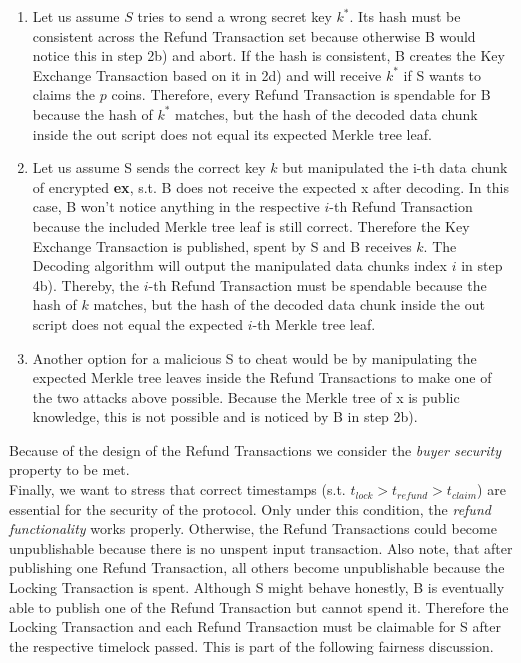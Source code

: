\documentclass{cacthesis}
\newcounter{protocol}
\begin{document}
        \begin{enumerate}
            \item Let us assume $S$ tries to send a wrong secret key $k^*$. Its hash must be consistent across the Refund Transaction set because otherwise B would notice this in step 2b) and abort. If the hash is consistent, B creates the Key Exchange Transaction based on it in 2d) and will receive $k^*$ if S wants to claims the $p$ coins. Therefore, every Refund Transaction is spendable for B because the hash of $k^*$ matches, but the hash of the decoded data chunk inside the out script does not equal its expected Merkle tree leaf.

            \item Let us assume S sends the correct key $k$ but manipulated the i-th data chunk of encrypted \textsf{\textbf{ex}}, s.t. B does not receive the expected \textsf{x} after decoding. In this case, B won't notice anything in the respective $i$-th Refund Transaction because the included Merkle tree leaf is still correct. Therefore the Key Exchange Transaction is published, spent by S and  B receives $k$.  The \textsf{Decoding} algorithm will output the manipulated data chunks index $i$ in step 4b). Thereby, the $i$-th Refund Transaction must be spendable because the hash of $k$ matches, but the hash of the decoded data chunk inside the out script does not equal the expected $i$-th Merkle tree leaf.

            \item Another option for a malicious S to cheat would be by manipulating the expected Merkle tree leaves inside the Refund Transactions to make one of the two attacks above possible. Because the Merkle tree of \textsf{x} is public knowledge, this is not possible and is noticed by B in step 2b). 
        \end{enumerate}
        Because of the design of the Refund Transactions we consider the \textit{buyer security} property to be met. \\
        Finally, we want to stress that correct timestamps (s.t. $t_{lock} > t_{refund} > t_{claim}$) are essential for the security of the protocol. Only under this condition, the \textit{refund functionality} works properly. Otherwise, the Refund Transactions could become unpublishable because there is no unspent input transaction. Also note, that after publishing one Refund Transaction, all others become unpublishable because the Locking Transaction is spent. Although S might behave honestly, B is eventually able to publish one of the Refund Transaction but cannot spend it. Therefore the Locking Transaction and each Refund Transaction must be claimable for S after the respective timelock passed. This is part of the following fairness discussion.
\end{document}
